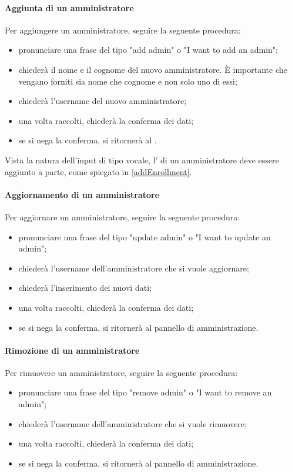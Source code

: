 \paragraph{Aggiunta di un amministratore}\label{AddAdmin}
Per aggiungere un amministratore, seguire la seguente procedura:
\begin{itemize}
	\item pronunciare una frase del tipo "add admin" o "I want to add an admin";
	\item \PROGETTO{} chiederà il nome e il cognome del nuovo amministratore. È importante che vengano forniti sia nome che cognome e non solo uno di essi;
	\item \PROGETTO{} chiederà l'username del nuovo amministratore;
	\item una volta raccolti, \PROGETTO{} chiederà la conferma dei dati;
	\item se si nega la conferma, si ritornerà al .
\end{itemize}

Vista la natura dell'input di tipo vocale, l' di un amministratore deve essere aggiunto a parte, come spiegato in \ref{addEnrollment}.
\paragraph{Aggiornamento di un amministratore}
 Per aggiornare un amministratore, seguire la seguente procedura:
\begin{itemize}
	\item pronunciare una frase del tipo "update admin" o "I want to update an admin";
	\item \PROGETTO{} chiederà l'username dell'amministratore che si vuole aggiornare;
	\item \PROGETTO{} chiederà l'inserimento dei nuovi dati;
	\item una volta raccolti, \PROGETTO{} chiederà la conferma dei dati;
	\item se si nega la conferma, si ritornerà al pannello di amministrazione.
\end{itemize}

\paragraph{Rimozione di un amministratore}
 Per rimuovere un amministratore, seguire la seguente procedura:
\begin{itemize}
	\item pronunciare una frase del tipo "remove admin" o "I want to remove an admin";
	\item \PROGETTO{} chiederà l'username dell'amministratore che si vuole rimuovere;
	\item una volta raccolti, \PROGETTO{} chiederà la conferma dei dati;
	\item se si nega la conferma, si ritornerà al pannello di amministrazione.
\end{itemize}

